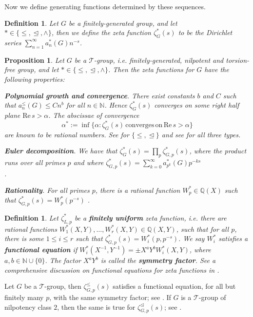 \documentclass[12pt]{article}
\newtheorem{proposition}[theorem]{Proposition}
\newtheorem{definition}[theorem]{Definition}
\begin{document}
Now we define generating functions determined by these sequences. 
\begin{definition}
\label{def:zeta.function}
Let $G$ be a finitely-generated group, and let\\ $\ast\in\{\leq,\trianglelefteq,\wedge\}$, then we define the zeta function $\zeta_{G}^{\ast}(s)$ to be the Dirichlet series $\sum_{n=1}^{\infty}a_{n}^{\ast}(G){n}^{-s}$. 
\end{definition}
\begin{proposition}
Let $G$ be a $\mathcal{T}$-group, i.e. finitely-generated, nilpotent and torsion-free group, and let $\ast\in\{\leq,\trianglelefteq,\wedge\}$. Then the zeta functions for $G$ have the following properties:\par
\textbf{Polynomial growth and convergence}. There exist constants $b$ and $C$ such that $a_{n}^{\leq}(G)\leq{C}{n}^{b}$ for all $n\in\mathbb{N}$. Hence $\zeta_{G}^{\ast}(s)$ converges on some right half plane $\mathrm{Re}\,s>\alpha$. The abscissae of convergence \[\alpha^{\ast}:=\inf\{\alpha : \zeta_{G}^{\ast}(s)\,\mathrm{converges}\,\mathrm{on}\,\mathrm{Re}\,s>\alpha\}\] are known to be rational numbers. See \cite[Theorem 1.1]{DuSautoyGrunewald} for $\{\leq,\trianglelefteq\}$ and see \cite[Theorem 7.2]{HrushovskiMartinRideau} for all three types.

\textbf{Euler decomposition}.
We have that $\zeta_{G}^{\ast}(s)=\prod_{p}\zeta_{G,p}^{\ast}(s)$, where the product runs over all primes $p$ and where $\zeta_{G,p}^{\ast}(s)=\sum_{k=0}^{\infty}a_{p^k}^{\ast}(G)p^{-ks}$\\ \cite[Proposition 4]{GrunewaldSegalSmith}.

\textbf{Rationality}. For all primes $p$, there is a rational function $W_{p}^{\ast}\in\mathbb{Q}(X)$ such that $\zeta_{G,p}^{\ast}(s)=W_{p}^{\ast}(p^{-s})$ \cite[Theorem 1]{GrunewaldSegalSmith}.
\end{proposition}
\begin{definition}
Let $\zeta_{L,p}^{\ast}$ be a \textbf{finitely uniform} zeta function, i.e. there are rational functions $W_{1}^{\ast}(X,Y),\dots,W_{r}^{\ast}(X,Y)\in\mathbb{Q}(X,Y)$, such that for all $p$, there is some $1\leq{i}\leq{r}$ such that $\zeta_{G,p}^{\ast}(s)=W_{i}^{\ast}(p,p^{-s})$. We say $W_{i}^{\ast}$ satisfies a \textbf{functional equation} if $W_{i}^{\ast}(X^{-1},Y^{-1})=\pm{X}^{a}{Y}^{b}{W_{i}^{\ast}(X,Y)}$, where $a,b\in\mathbb{N}\cup\{0\}$. The factor $X^{a}Y^{b}$ is called the \textbf{symmetry factor}. See a comprehensive discussion on functional equations for zeta functions in \cite{Voll}.
\end{definition}
Let $G$ be a $\mathcal{T}$-group, then $\zeta_{G,p}^{\leq}(s)$ satisfies a functional equation, for all but finitely many $p$, with the same symmetry factor; see \cite[Corollary 1.1]{Voll}. If $G$ is a $\mathcal{T}$-group of nilpotency class $2$, then the same is true for $\zeta_{G,p}^{\trianglelefteq}(s)$; see \cite[Theorem C]{Voll}.
\end{document}
